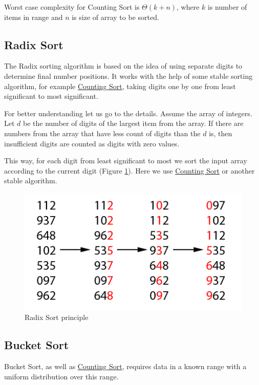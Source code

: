 \documentclass[
  field=inf,
  biblatex,
  language=english,
  glossaries,
  theorems=false,
  sourcecodes=false,
  index
]{kidiplom}
\begin{document}
Worst case complexity for Counting Sort is $\Theta(k + n)$, where $k$ is number of items in range and $n$ is size of array to be sorted.

\subsection{Radix Sort}

The Radix sorting algorithm is based on the idea of using separate digits to determine final number positions. It works with the help of some stable sorting algorithm, for example \hyperref[sec:counting]{Counting Sort}, taking digits one by one from least significant to most significant.

For better understanding let us go to the details. Assume the array of integers. Let $d$ be the number of digits of the largest item from the array. If there are numbers from the array that have less count of digits than the $d$ is, then insufficient digits are counted as digits with zero values.

This way, for each digit from least significant to most we sort the input array according to the current digit (Figure \ref{fig:radixsort}). Here we use \hyperref[sec:counting]{Counting Sort} or another stable algorithm.

\begin{figure}[H]
\begin{center}
	
	\includegraphics[scale=2]{img/Radixsort.png}
	\caption{Radix Sort principle}\label{fig:radixsort}
\end{center}
\end{figure}

\subsection{Bucket Sort}

Bucket Sort, as well as \hyperref[sec:counting]{Counting Sort}, requires data in a known range with a uniform distribution over this range.
\end{document}
